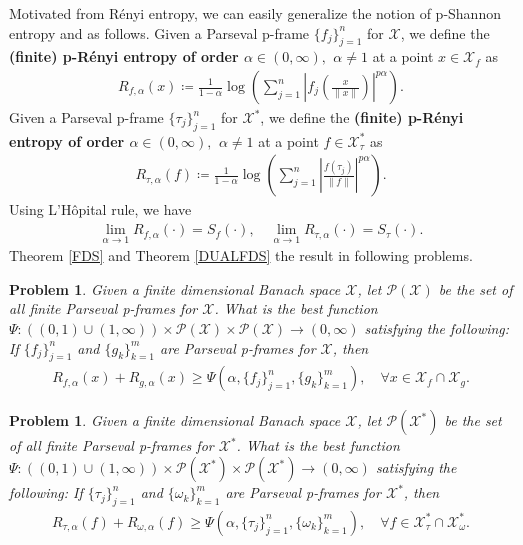 \documentclass{amsart}
\newtheorem{problem}[theorem]{Problem}
\begin{document}
Motivated from R\'{e}nyi entropy, we can easily generalize the notion of p-Shannon entropy and as follows. 
Given a Parseval p-frame $\{f_j\}_{j=1}^n$   for $\mathcal{X}$, we define the \textbf{(finite) p-R\'{e}nyi entropy   of order $\alpha \in (0, \infty),$ $\alpha \neq 1$} at a point $x \in \mathcal{X}_f$  as 
\begin{align*}
	R_{f, \alpha}(x)\coloneqq \frac{1}{1-\alpha}\log\left(\sum_{j=1}^{n}\left|f_j\left(\frac{x}{\|x\|}\right)\right|^{p\alpha}\right). 
\end{align*}
Given a Parseval p-frame $\{\tau_j\}_{j=1}^n$   for $\mathcal{X}^*$, we define the  \textbf{(finite) p-R\'{e}nyi  entropy  of order $\alpha \in (0, \infty),$ $\alpha \neq 1$}   at a point $f \in \mathcal{X}^* _\tau$  as 
\begin{align*}
	R_{\tau, \alpha}(f)\coloneqq \frac{1}{1-\alpha}\log\left(\sum_{j=1}^{n}\left|\frac{f(\tau_j)}{\|f\|}\right|^{p\alpha}\right).
\end{align*}
Using L'H\^{o}pital rule, we have 
\begin{align*}
\lim_{\alpha \to 1}R_{f, \alpha}(\cdot)=S_f(\cdot), \quad 	\lim_{\alpha \to 1}R_{\tau, \alpha}(\cdot)=S_\tau(\cdot).
\end{align*}
Theorem \ref{FDS} and Theorem \ref{DUALFDS} the result in following problems.
\begin{problem}
Given a finite dimensional Banach space $\mathcal{X}$, let $\mathcal{P}(\mathcal{X})$ be the set of all finite Parseval p-frames  for  $\mathcal{X}$.	What is the best function $\Psi:((0,1)\cup (1, \infty))\times \mathcal{P}(\mathcal{X})\times \mathcal{P}(\mathcal{X}) \to (0, \infty)$ satisfying the following: If $\{f_j\}_{j=1}^n$ and $\{g_k\}_{k=1}^m$ are   Parseval p-frames  for  $\mathcal{X}$, then 
\begin{align*}
	R_{f, \alpha} (x)+R_{g, \alpha} (x)\geq \Psi (\alpha, \{f_j\}_{j=1}^n, \{g_k\}_{k=1}^m), \quad \forall x \in \mathcal{X}_f \cap \mathcal{X}_g.
\end{align*}
\end{problem}
\begin{problem}
Given a finite dimensional Banach space $\mathcal{X}$, let $\mathcal{P}(\mathcal{X}^*)$ be the set of all finite Parseval p-frames  for  $\mathcal{X}^*$.	What is the best function $\Psi:((0,1)\cup (1, \infty))\times \mathcal{P}(\mathcal{X}^*)\times \mathcal{P}(\mathcal{X}^*) \to (0, \infty)$ satisfying the following: If $\{\tau_j\}_{j=1}^n$ and $\{\omega_k\}_{k=1}^m$ are   Parseval p-frames  for  $\mathcal{X}^*$, then 
\begin{align*}
	R_{\tau, \alpha} (f)+R_{\omega, \alpha} (f)\geq \Psi (\alpha, \{\tau_j\}_{j=1}^n, \{\omega_k\}_{k=1}^m), \quad \forall f \in \mathcal{X}^*_\tau \cap \mathcal{X}^*_\omega.
\end{align*}	
\end{problem}
\end{document}
